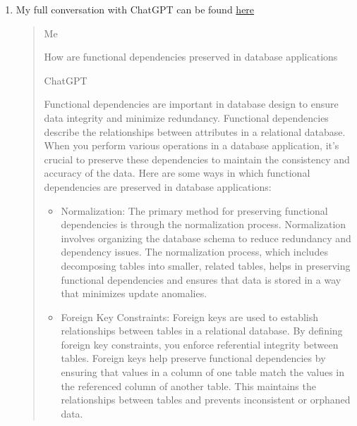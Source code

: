 \documentclass[11pt]{article}
\begin{document}
\begin{enumerate}
\begin{enumerate}
\item To show that this reduction to 3NF is dependency preserving (it must be by construction...), we must show that the union of the functional dependencies closure is the same as the the closure of the initial functional dependencies.  There is actually nothing to show here since all of the functional dependencies appeared after the decomposition.  Some of them were simplified or combined but all appeared in the union before you attempt a closure.  Thus it is dependency preserving decomposition.  
\end{enumerate}
\item My full conversation with ChatGPT can be found \href{https://chat.openai.com/share/cc70dceb-1b3a-4d66-a3fd-753957345e24}{here}

\begin{quotation}
Me

How are functional dependencies preserved in database applications

ChatGPT

Functional dependencies are important in database design to ensure data integrity and minimize redundancy. Functional dependencies describe the relationships between attributes in a relational database. When you perform various operations in a database application, it's crucial to preserve these dependencies to maintain the consistency and accuracy of the data. Here are some ways in which functional dependencies are preserved in database applications:
\begin{itemize}
\item    Normalization:
        The primary method for preserving functional dependencies is through the normalization process. Normalization involves organizing the database schema to reduce redundancy and dependency issues.
        The normalization process, which includes decomposing tables into smaller, related tables, helps in preserving functional dependencies and ensures that data is stored in a way that minimizes update anomalies.

 \item   Foreign Key Constraints:
        Foreign keys are used to establish relationships between tables in a relational database. By defining foreign key constraints, you enforce referential integrity between tables.
        Foreign keys help preserve functional dependencies by ensuring that values in a column of one table match the values in the referenced column of another table. This maintains the relationships between tables and prevents inconsistent or orphaned data.


\end{itemize}
\end{quotation}
\end{enumerate}
\end{document}
